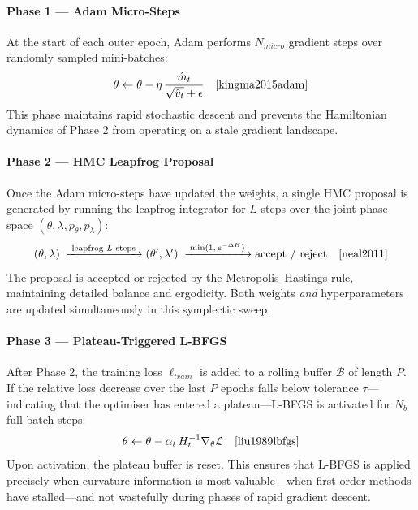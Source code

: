 \documentclass[12pt,a4paper]{article}
\begin{document}
\paragraph{Phase 1 — Adam Micro-Steps}
At the start of each outer epoch, Adam performs $N_{micro}$
gradient steps over randomly sampled mini-batches:
\begin{equation}
\theta \leftarrow \theta - \eta\,\frac{\hat{m}_t}{\sqrt{\hat{v}_t}+\epsilon}
\quad \cite{kingma2015adam}
\end{equation}
This phase maintains rapid stochastic descent and prevents the
Hamiltonian dynamics of Phase 2 from operating on a stale gradient
landscape.

\paragraph{Phase 2 — HMC Leapfrog Proposal}
Once the Adam micro-steps have updated the weights, a single HMC
proposal is generated by running the leapfrog integrator for $L$
steps over the joint phase space $(\theta, \lambda, p_\theta, p_\lambda)$:
\begin{equation}
(\theta,\lambda)
\;\xrightarrow{\;\text{leapfrog }L\text{ steps}\;}
(\theta',\lambda')
\;\xrightarrow{\;\min(1,\,e^{-\Delta H})\;}
\text{accept / reject}
\quad \cite{neal2011}
\end{equation}
The proposal is accepted or rejected by the Metropolis--Hastings rule,
maintaining detailed balance and ergodicity.  Both weights \emph{and}
hyperparameters are updated simultaneously in this symplectic sweep.

\paragraph{Phase 3 — Plateau-Triggered L-BFGS}
After Phase 2, the training loss $\ell_{train}$ is added to a rolling
buffer $\mathcal{B}$ of length $P$.  If the relative loss decrease over
the last $P$ epochs falls below tolerance $\tau$—indicating that the
optimiser has entered a plateau—L-BFGS is activated for $N_b$ full-batch
steps:
\begin{equation}
\theta \leftarrow \theta - \alpha_t\,H_t^{-1}\nabla_\theta\mathcal{L}
\quad \cite{liu1989lbfgs}
\end{equation}
Upon activation, the plateau buffer is reset.  This ensures that
L-BFGS is applied precisely when curvature information is most
valuable—when first-order methods have stalled—and not wastefully
during phases of rapid gradient descent.
\end{document}
